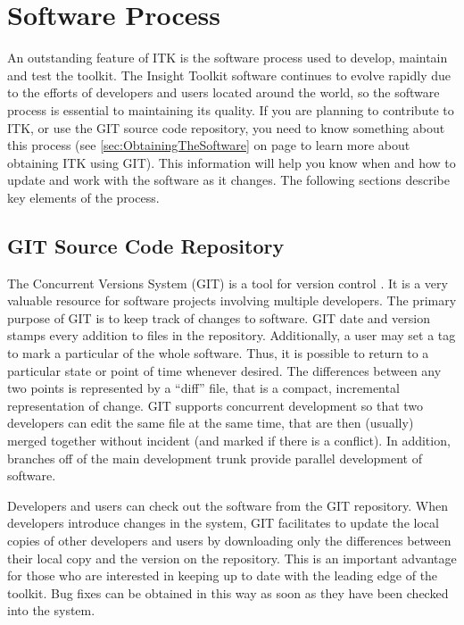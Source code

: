\chapter{Software Process}
\label{chapter:SoftwareProcess}

An outstanding feature of ITK is the software process used to develop,
maintain and test the toolkit. The Insight Toolkit software continues to
evolve rapidly due to the efforts of developers and users located around the
world, so the software process is essential to maintaining its quality. If
you are planning to contribute to ITK, or use the GIT source code repository,
you need to know something about this process (see
\ref{sec:ObtainingTheSoftware} on page \pageref{sec:ObtainingTheSoftware} to
learn more about obtaining ITK using GIT). This information will help you
know when and how to update and work with the software as it changes. The
following sections describe key elements of the process.

\section{GIT Source Code Repository}
\label{sec:GITRepository}


The Concurrent Versions System (GIT) is a tool for version control
\cite{Fogel1999}. It is a very valuable resource for software projects
involving multiple developers.  The primary purpose of GIT is to keep
track of changes to software. GIT date and version stamps every
addition to files in the repository. Additionally, a user may set a
tag to mark a particular of the whole software. Thus, it is possible
to return to a particular state or point of time whenever desired. The
differences between any two points is represented by a ``diff'' file,
that is a compact, incremental representation of change. GIT supports
concurrent development so that two developers can edit the same file
at the same time, that are then (usually) merged together without
incident (and marked if there is a conflict). In addition, branches
off of the main development trunk provide parallel development of
software.

Developers and users can check out the software from the GIT repository. When
developers introduce changes in the system,  GIT facilitates to update the
local copies of other developers and users by downloading only the differences
between their local copy and the version on the repository.  This is an
important advantage for those who are interested in keeping up to date with the
leading edge of the toolkit. Bug fixes can be obtained in this way as soon as
they have been checked into the system.

